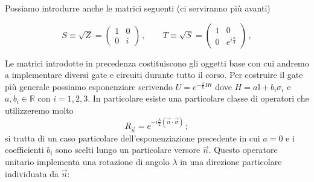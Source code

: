 \noindent Possiamo introdurre anche le matrici seguenti (ci serviranno più avanti)

\begin{equation}\label{S_T_matrices}
    S \equiv \sqrt{Z} =
\begin{pmatrix}
    1 & 0 \\ 0 & i
\end{pmatrix} \, , \qquad 
T \equiv \sqrt{S} =
\begin{pmatrix}
    1 & 0 \\ 0 & e^{i \frac{\pi}{4}}
\end{pmatrix} \, ,
\end{equation}

\noindent Le matrici introdotte in precedenza costituiscono gli oggetti base con cui andremo a implementare diversi gate e circuiti durante tutto il corso. Per costruire il gate più generale possiamo esponenziare scrivendo $U = e^{-\frac{i}{\hbar} H t}$ dove $H = a \mathbb{I} + b_i \sigma_i$ e $a, b_i \in \mathbb{R}$ con $i = 1,2,3$. In particolare esiste una particolare classe di operatori che utilizzeremo molto
\begin{equation*}
    R_{\vec{n}} = e^{-i \frac{\lambda}{2} (\vec n \cdot \vec \sigma)} \, ;
\end{equation*}
si tratta di un caso particolare dell'esponenziazione precedente in cui $a = 0$ e i coefficienti $b_i$ sono scelti lungo un particolare versore $\vec n$. Questo operatore unitario implementa una rotazione di angolo $\lambda$ in una direzione particolare individuata da $\vec n$:

